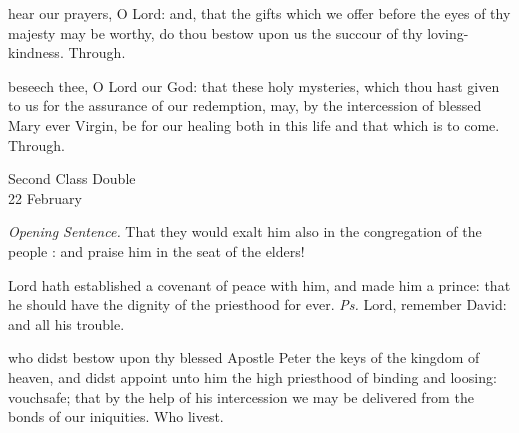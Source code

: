 \vspace{-3ex}

\secret
{} hear our prayers, O Lord: and, that the gifts which we offer before the eyes of thy majesty may be worthy, do thou bestow upon us the succour of thy loving-kindness. Through.

\vspace{-1.5ex}

\postcommunion
{} beseech thee, O Lord our God: that these holy mysteries, which thou hast given to us for the assurance of our redemption, may, by the intercession of blessed Mary ever Virgin, be for our healing both in this life and that which is to come. Through.


\begin{inhead}
    {Second Class Double\\
22 February}
\end{inhead}
\par\noindent
\textit{Opening Sentence.} That they would exalt him also in the congregation of the people : and praise him in the seat of the elders!%

\vspace{-1.5ex}

\introit
{} Lord hath established a covenant of peace with him, and made him a prince: that he should have the dignity of the priesthood for ever. \textit{Ps.} Lord, remember David: and all his trouble.

\vspace{-1.5ex}

\collect
{} who didst bestow upon thy blessed Apostle Peter the keys of the kingdom of heaven, and didst appoint unto him the high priesthood of binding and loosing: vouchsafe; that by the help of his intercession we may be delivered from the bonds of our iniquities. Who livest.


